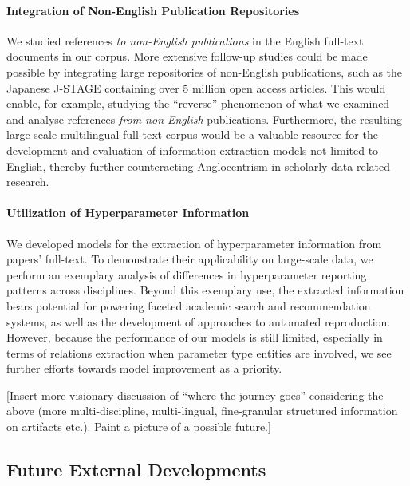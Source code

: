 
\paragraph{Integration of Non-English Publication Repositories}
We studied references \emph{to non-English publications} in the English full-text documents in our corpus. More extensive follow-up studies could be made possible by integrating large repositories of non-English publications, such as the Japanese J-STAGE containing over 5 million open access articles. This would enable, for example, studying the ``reverse'' phenomenon of what we examined and analyse references \emph{from non-English} publications. Furthermore, the resulting large-scale multilingual full-text corpus would be a valuable resource for the development and evaluation of information extraction models not limited to English, thereby further counteracting Anglocentrism in scholarly data related research.

\paragraph{Utilization of Hyperparameter Information}
We developed models for the extraction of hyperparameter information from papers' full-text. To demonstrate their applicability on large-scale data, we perform an exemplary analysis of differences in hyperparameter reporting patterns across disciplines. Beyond this exemplary use, the extracted information bears potential for powering faceted academic search and recommendation systems, as well as the development of approaches to automated reproduction. However, because the performance of our models is still limited, especially in terms of relations extraction when parameter type entities are involved, we see further efforts towards model improvement as a priority.

[Insert more visionary discussion of ``where the journey goes'' considering the above (more multi-discipline, multi-lingual, fine-granular structured information on artifacts etc.). Paint a picture of a possible future.]

\subsection{Future External Developments}

